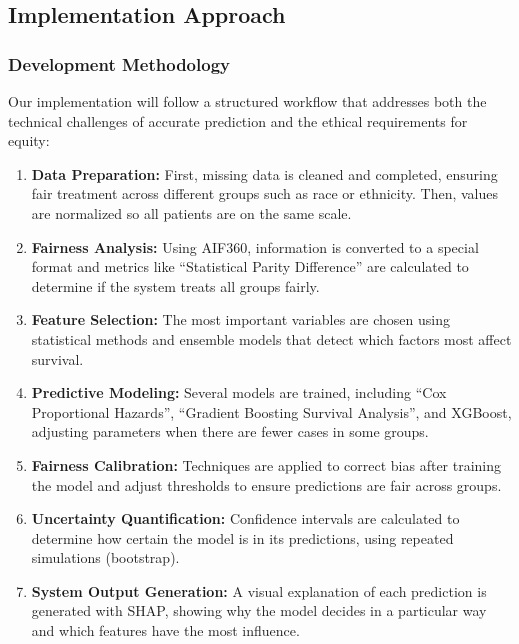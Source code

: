 \subsection{Implementation Approach}

\subsubsection{Development Methodology}

Our implementation will follow a structured workflow that addresses both the technical challenges of accurate prediction and the ethical requirements for equity:

\begin{enumerate}
    \item \textbf{Data Preparation:} First, missing data is cleaned and completed, ensuring fair treatment across different groups such as race or ethnicity. Then, values are normalized so all patients are on the same scale.
    
    \item \textbf{Fairness Analysis:} Using AIF360, information is converted to a special format and metrics like ``Statistical Parity Difference'' are calculated to determine if the system treats all groups fairly.
    
    \item \textbf{Feature Selection:} The most important variables are chosen using statistical methods and ensemble models that detect which factors most affect survival.
    
    \item \textbf{Predictive Modeling:} Several models are trained, including ``Cox Proportional Hazards'', ``Gradient Boosting Survival Analysis'', and XGBoost, adjusting parameters when there are fewer cases in some groups.
    
    \item \textbf{Fairness Calibration:} Techniques are applied to correct bias after training the model and adjust thresholds to ensure predictions are fair across groups.
    
    \item \textbf{Uncertainty Quantification:} Confidence intervals are calculated to determine how certain the model is in its predictions, using repeated simulations (bootstrap).
    
    \item \textbf{System Output Generation:} A visual explanation of each prediction is generated with SHAP, showing why the model decides in a particular way and which features have the most influence.
\end{enumerate}

